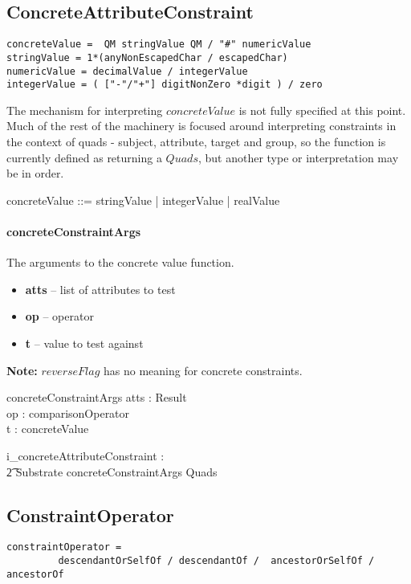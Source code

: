 \documentclass{article}
\begin{document}
\subsection{ConcreteAttributeConstraint}
\begin{verbatim}
concreteValue =  QM stringValue QM / "#" numericValue 
stringValue = 1*(anyNonEscapedChar / escapedChar)
numericValue = decimalValue / integerValue
integerValue = ( ["-"/"+"] digitNonZero *digit ) / zero
\end{verbatim}
The mechanism for interpreting $concreteValue$ is not fully specified at this point. 
Much of the rest of the machinery is focused around interpreting constraints in the context
of quads - subject, attribute, target and group, so the function is currently defined as returning
a $Quads$, but another type or interpretation may be in order.
\begin{zed}
concreteValue ::= stringValue | integerValue | realValue 
\end{zed}

\paragraph{concreteConstraintArgs}  The arguments to the concrete value function.
\begin{itemize}[noitemsep,nolistsep]
\item \textbf{atts} -- list of attributes to test
\item \textbf{op} -- operator
\item \textbf{t} -- value to test against
\end{itemize}
\noindent 
\textbf{Note:} $reverseFlag$ has no meaning for concrete constraints.

\begin{schema}{concreteConstraintArgs}
   atts : Result \\
   op : comparisonOperator \\
   t : concreteValue
\end{schema}

\begin{gendef}
  i\_concreteAttributeConstraint : \\
\t2 Substrate \fun concreteConstraintArgs \fun Quads
\end{gendef}


\subsection{ConstraintOperator}
\begin{verbatim}
constraintOperator = 
         descendantOrSelfOf / descendantOf /  ancestorOrSelfOf / ancestorOf 
\end{verbatim}
\end{document}
